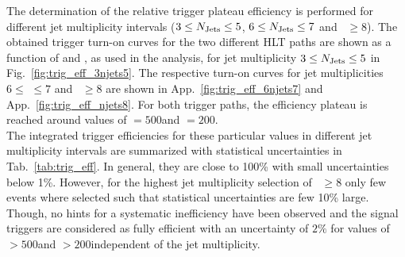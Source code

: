 The determination of the relative trigger plateau efficiency is performed for different jet multiplicity intervals ($3 \leq N_{\text{Jets}} \leq 5$, $6 \leq N_{\text{Jets}} \leq 7$ and \NJets~$ \ge 8$). The obtained trigger turn-on curves for the two different HLT paths are shown as a function of \HT and \MHT, as used in the analysis, for jet multiplicity $3 \leq N_{\text{Jets}} \leq 5$ in Fig.~\ref{fig:trig_eff_3njets5}. The respective turn-on curves for jet multiplicities $6 \leq$ \NJets $\leq 7$ and \NJets~$ \ge 8$ are shown in App.~\ref{fig:trig_eff_6njets7} and App.~\ref{fig:trig_eff_njets8}. For both trigger paths, the efficiency plateau is reached around values of \HT$ = 500$\gev and \MHT$ = 200$\gev. \\
The integrated trigger efficiencies for these particular values in different jet multiplicity intervals are summarized with statistical uncertainties in Tab.~\ref{tab:trig_eff}. In general, they are close to 100\% with small uncertainties below 1\%. However, for the highest jet multiplicity selection of \NJets~$ \ge 8$ only few events where selected such that statistical uncertainties are few 10\% large. Though, no hints for a systematic inefficiency have been observed and the signal triggers are considered as fully efficient with an uncertainty of $2\%$ for values of \HT$ > 500$\gev and \MHT$ > 200$\gev independent of the jet multiplicity. 
